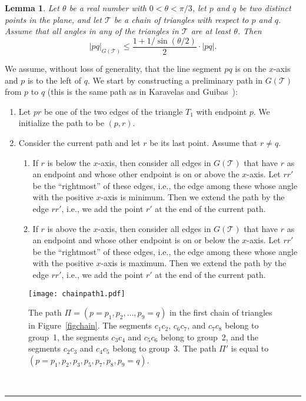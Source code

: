 \documentclass[12pt]{article}
\newtheorem{lemma}{Lemma}
\newcommand{\qed}{\rule{0.5em}{1.5ex}}
\newcommand{\fqed}{{\hfill~\qed}}
\newenvironment{proof}{{\noindent \bf Proof.}}
                      {{\hfill \fqed} \vspace{1em}}
\begin{document}
\begin{lemma}
\label{lemchain}  
Let $\theta$ be a real number with $0 < \theta < \pi/3$, let $p$ and $q$ 
be two distinct points in the plane, and let $\mathcal{T}$ be a 
chain of triangles with respect to $p$ and $q$. Assume that all angles 
in any of the triangles in $\mathcal{T}$ are at least $\theta$. Then 
\[ |pq|_{G(\mathcal{T})} \leq 
      \frac{1+ 1 / \sin(\theta/2)}{2} \cdot |pq| .
\]
\end{lemma} 
\begin{proof}
We assume, without loss of generality, that the line segment $pq$ is 
on the $x$-axis and $p$ is to the left of $q$. We start by constructing 
a preliminary path in $G(\mathcal{T})$ from $p$ to $q$ (this is the 
same path as in Karavelas and Guibas~\cite{kg-skgsa-01}): 
\begin{enumerate} 
\item Let $pr$ be one of the two edges of the triangle $T_1$ with 
      endpoint $p$. We initialize the path to be $(p,r)$. 
\item Consider the current path and let $r$ be its last point. 
      Assume that $r \neq q$. 
      \begin{enumerate} 
      \item If $r$ is below the $x$-axis, then consider all edges in  
            $G(\mathcal{T})$ that have $r$ as an endpoint and whose other 
            endpoint is on or above the $x$-axis. Let $rr'$ be the 
            ``rightmost'' of these edges, i.e., the edge among these 
            whose angle with the positive $x$-axis is minimum. Then we 
            extend the path by the edge $rr'$, i.e., we add the point 
            $r'$ at the end of the current path.
      \item If $r$ is above the $x$-axis, then consider all edges in 
            $G(\mathcal{T})$ that have $r$ as an endpoint and whose other 
            endpoint is on or below the $x$-axis. Let $rr'$ be the 
            ``rightmost'' of these edges, i.e., the edge among these 
            whose angle with the positive $x$-axis is maximum. Then we 
            extend the path by the edge $rr'$, i.e., we add the point 
            $r'$ at the end of the current path.
      \end{enumerate} 
\end{enumerate} 

\begin{figure}
\begin{center}
\texttt{[image: chainpath1.pdf]}
\end{center}
\caption{The path $\Pi = (p=p_1,p_2,\ldots,p_9=q)$ in the first chain of 
         triangles in Figure~\ref{figchain}. The segments $c_1 c_2$, 
         $c_6 c_7$, and $c_7 c_8$ belong to group~1, the segments 
         $c_3 c_4$ and $c_5 c_6$ belong to group~2, and the segments 
         $c_2 c_3$ and $c_4 c_5$ belong to group~3. The path $\Pi'$ 
         is equal to $(p=p_1,p_2,p_3,p_5,p_7,p_8,p_9=q)$.}
\label{figchainpath}
\end{figure}


\end{proof}
\end{document}
